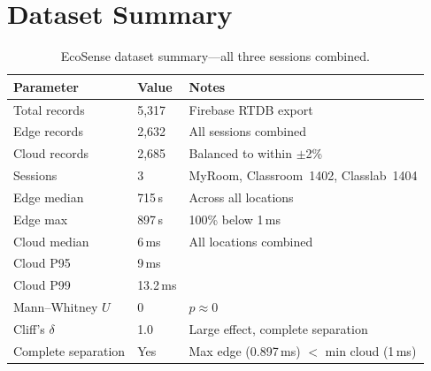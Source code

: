 \documentclass[12pt, a4paper]{article}
\newcommand{\us}{\,\textmu s}
\newcommand{\ms}{\,ms}
\begin{document}
\appendix
\section{Dataset Summary}

\begin{table}[H]
\centering
\caption{EcoSense dataset summary---all three sessions combined.}
\label{tab:appendix}
\renewcommand{\arraystretch}{1.15}
\begin{tabular}{lll}
\toprule
\textbf{Parameter} & \textbf{Value} & \textbf{Notes} \\
\midrule
Total records         & 5{,}317   & Firebase RTDB export \\
Edge records          & 2{,}632   & All sessions combined \\
Cloud records         & 2{,}685   & Balanced to within $\pm$2\% \\
Sessions              & 3         & MyRoom, Classroom~1402, Classlab~1404 \\
Edge median           & 715\us    & Across all locations \\
Edge max              & 897\us    & 100\% below 1\ms \\
Cloud median          & 6\ms      & All locations combined \\
Cloud P95             & 9\ms      & \\
Cloud P99             & 13.2\ms   & \\
Mann--Whitney $U$     & 0         & $p \approx 0$ \\
Cliff's $\delta$      & 1.0       & Large effect, complete separation \\
Complete separation   & Yes       & Max edge (0.897\ms) $<$ min cloud (1\ms) \\
\bottomrule
\end{tabular}
\end{table}
\end{document}
